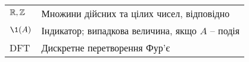 
\bigskip


\begin{tabular}{ll}

    $\mathbb R, \mathbb Z$ & Множини дійсних та цілих чисел, відповідно \\
    $\1(A)$ & Індикатор; випадкова величина, якщо $A$ -- подія\\
    DFT & Дискретне перетворення Фур'є\\


\end{tabular}